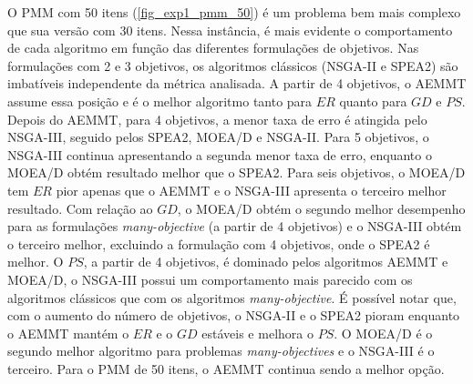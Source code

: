 O PMM com 50 itens (\autoref{fig_exp1_pmm_50}) é um problema bem mais complexo que sua versão com 30 itens. Nessa instância, é mais evidente  o comportamento de cada algoritmo em função das diferentes formulações de objetivos. Nas formulações com 2 e 3 objetivos, os algoritmos clássicos (NSGA-II e SPEA2) são imbatíveis independente da métrica analisada. A partir de 4 objetivos, o AEMMT assume essa posição e é o melhor algoritmo tanto para $ER$ quanto para $GD$ e $PS$. Depois do AEMMT, para 4 objetivos, a menor taxa de erro é atingida pelo NSGA-III, seguido pelos SPEA2, MOEA/D e NSGA-II. Para 5 objetivos, o NSGA-III continua apresentando a segunda menor taxa de erro, enquanto o MOEA/D obtém resultado melhor que o SPEA2. Para seis objetivos, o MOEA/D tem $ER$ pior apenas que o AEMMT e o NSGA-III apresenta o terceiro melhor resultado. Com relação ao $GD$, o MOEA/D obtém o segundo melhor desempenho para as formulações \textit{many-objective} (a partir de 4 objetivos) e o NSGA-III obtém o terceiro melhor, excluindo a formulação com 4 objetivos, onde o SPEA2 é melhor. O $PS$, a partir de 4 objetivos, é dominado pelos algoritmos AEMMT e MOEA/D, o NSGA-III possui um comportamento mais parecido com os algoritmos clássicos que com os algoritmos \textit{many-objective}.  É possível notar que, com o aumento do número de objetivos, o NSGA-II e o SPEA2 pioram enquanto o AEMMT mantém o $ER$ e o $GD$ estáveis e melhora o $PS$. O MOEA/D é o segundo melhor algoritmo para problemas \textit{many-objectives} e o NSGA-III é o terceiro. Para o PMM de 50 itens, o AEMMT continua sendo a melhor opção.

